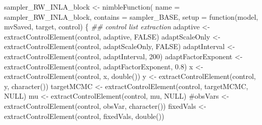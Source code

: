 \documentclass[
]{article}
\newenvironment{Shaded}{\begin{snugshade}}{\end{snugshade}}
\newcommand{\AttributeTok}[1]{\textcolor[rgb]{0.40,0.45,0.13}{#1}}
\newcommand{\CommentTok}[1]{\textcolor[rgb]{0.37,0.37,0.37}{#1}}
\newcommand{\ConstantTok}[1]{\textcolor[rgb]{0.56,0.35,0.01}{#1}}
\newcommand{\ControlFlowTok}[1]{\textcolor[rgb]{0.00,0.23,0.31}{#1}}
\newcommand{\DecValTok}[1]{\textcolor[rgb]{0.68,0.00,0.00}{#1}}
\newcommand{\DocumentationTok}[1]{\textcolor[rgb]{0.37,0.37,0.37}{\textit{#1}}}
\newcommand{\FloatTok}[1]{\textcolor[rgb]{0.68,0.00,0.00}{#1}}
\newcommand{\FunctionTok}[1]{\textcolor[rgb]{0.28,0.35,0.67}{#1}}
\newcommand{\NormalTok}[1]{\textcolor[rgb]{0.00,0.23,0.31}{#1}}
\newcommand{\OtherTok}[1]{\textcolor[rgb]{0.00,0.23,0.31}{#1}}
\newcommand{\StringTok}[1]{\textcolor[rgb]{0.13,0.47,0.30}{#1}}
\begin{document}
\begin{Shaded}
\begin{Highlighting}[]
\NormalTok{sampler\_RW\_INLA\_block }\OtherTok{\textless{}{-}} \FunctionTok{nimbleFunction}\NormalTok{(}
  \AttributeTok{name =} \StringTok{\textquotesingle{}sampler\_RW\_INLA\_block\textquotesingle{}}\NormalTok{,}
  \AttributeTok{contains =}\NormalTok{ sampler\_BASE,}
  \AttributeTok{setup =} \ControlFlowTok{function}\NormalTok{(model, mvSaved, target,  control) \{}
    \DocumentationTok{\#\# control list extraction}
\NormalTok{    adaptive            }\OtherTok{\textless{}{-}} \FunctionTok{extractControlElement}\NormalTok{(control, }\StringTok{\textquotesingle{}adaptive\textquotesingle{}}\NormalTok{,             }\ConstantTok{FALSE}\NormalTok{)}
\NormalTok{    adaptScaleOnly      }\OtherTok{\textless{}{-}} \FunctionTok{extractControlElement}\NormalTok{(control, }\StringTok{\textquotesingle{}adaptScaleOnly\textquotesingle{}}\NormalTok{,       }\ConstantTok{FALSE}\NormalTok{)}
\NormalTok{    adaptInterval       }\OtherTok{\textless{}{-}} \FunctionTok{extractControlElement}\NormalTok{(control, }\StringTok{\textquotesingle{}adaptInterval\textquotesingle{}}\NormalTok{,        }\DecValTok{200}\NormalTok{)}
\NormalTok{    adaptFactorExponent }\OtherTok{\textless{}{-}} \FunctionTok{extractControlElement}\NormalTok{(control, }\StringTok{\textquotesingle{}adaptFactorExponent\textquotesingle{}}\NormalTok{,  }\FloatTok{0.8}\NormalTok{)}
\NormalTok{    x                   }\OtherTok{\textless{}{-}} \FunctionTok{extractControlElement}\NormalTok{(control, }\StringTok{\textquotesingle{}x\textquotesingle{}}\NormalTok{,  }\FunctionTok{double}\NormalTok{())}
\NormalTok{    y                   }\OtherTok{\textless{}{-}} \FunctionTok{extractControlElement}\NormalTok{(control, }\StringTok{\textquotesingle{}y\textquotesingle{}}\NormalTok{,  }\FunctionTok{character}\NormalTok{())}
\NormalTok{    targetMCMC               }\OtherTok{\textless{}{-}} \FunctionTok{extractControlElement}\NormalTok{(control, }\StringTok{\textquotesingle{}targetMCMC\textquotesingle{}}\NormalTok{,              }\ConstantTok{NULL}\NormalTok{)}
\NormalTok{    mu                  }\OtherTok{\textless{}{-}} \FunctionTok{extractControlElement}\NormalTok{(control, }\StringTok{\textquotesingle{}mu\textquotesingle{}}\NormalTok{,  }\ConstantTok{NULL}\NormalTok{)}
    \CommentTok{\#obsVars \textless{}{-} extractControlElement(control, \textquotesingle{}obsVar\textquotesingle{},  character())}
\NormalTok{    fixedVals           }\OtherTok{\textless{}{-}} \FunctionTok{extractControlElement}\NormalTok{(control, }\StringTok{\textquotesingle{}fixedVals\textquotesingle{}}\NormalTok{,  }\FunctionTok{double}\NormalTok{())}

\end{Highlighting}
\end{Shaded}
\end{document}

